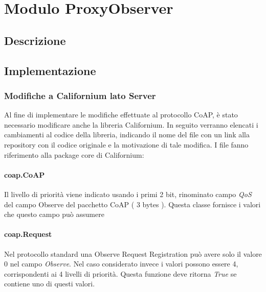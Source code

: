\chapter{Modulo ProxyObserver}
	\section {Descrizione}
	\section {Implementazione}
		\subsection {Modifiche a Californium lato Server}
			Al fine di implementare le modifiche effettuate al protocollo CoAP, è stato necessario modificare anche la libreria Californium. In seguito verranno elencati i cambiamenti al codice della libreria, indicando il nome del file con un link alla repository con il codice originale e la motivazione di tale modifica. I file fanno riferimento alla package core di Californium:
			\subsubsection{coap.CoAP}
				Il livello di priorità viene indicato usando i primi 2 bit, rinominato campo \textit{QoS} del campo Observe del pacchetto CoAP ( 3 bytes ).  Questa classe fornisce i valori che questo campo può assumere\newline
				

			\subsubsection{coap.Request}
				Nel protocollo standard una Observe Request Registration può avere solo il valore 0 nel campo \textit{Observe}. Nel caso considerato invece i valori possono essere 4, corrispondenti ai 4 livelli di priorità. Questa funzione deve ritorna \textit{True} se 	contiene uno di questi valori. \newline
				

